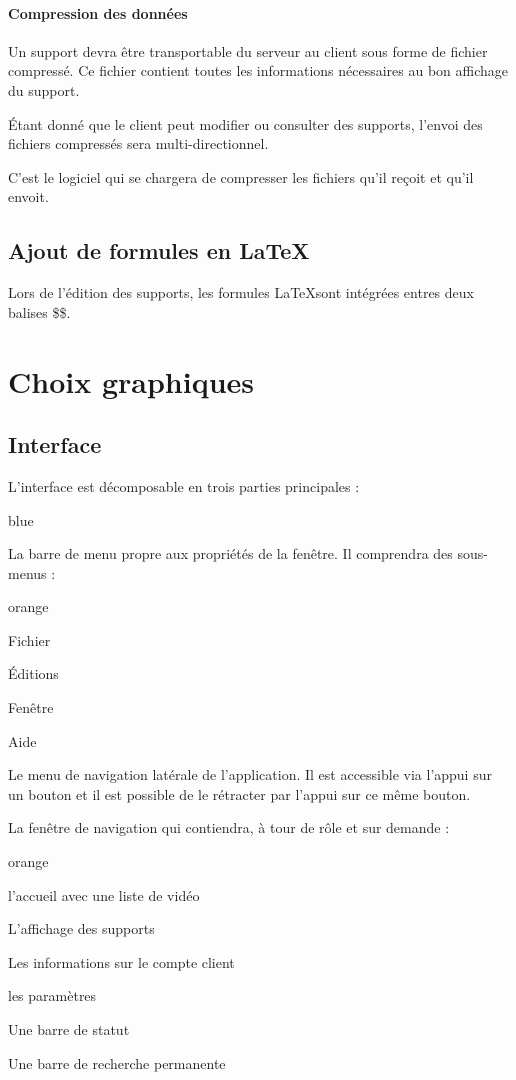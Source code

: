 \subsubsection{Compression des données}

Un support devra être transportable du serveur au client sous forme de fichier compressé. Ce fichier contient toutes les informations nécessaires au bon affichage du support.

Étant donné que le client peut modifier ou consulter des supports, l'envoi des fichiers compressés sera multi-directionnel.

C'est le logiciel qui se chargera de compresser les fichiers qu'il reçoit et qu'il envoit.


\section{Ajout de formules en \LaTeX}

Lors de l'édition des supports, les formules \LaTeX sont intégrées entres deux balises \$\$.


\chapter{Choix graphiques}

\section{Interface}

L'interface est décomposable en trois parties principales :

\begin{items}{blue}{\Triangle}
\item La barre de menu propre aux propriétés de la fenêtre. Il comprendra des sous-menus : 
 \begin{items}{orange}{\Circle}
    \item Fichier
    \item Éditions
    \item Fenêtre
    \item Aide
 \end{items}
 
 \item Le menu de navigation latérale de l'application. Il est accessible via l'appui sur un bouton et il est possible de le rétracter par l'appui sur ce même bouton.
 \item La fenêtre de navigation qui contiendra, à tour de rôle et sur demande : 
  \begin{items}{orange}{\Circle}
    \item l'accueil avec une liste de vidéo
    \item L'affichage des supports
    \item Les informations sur le compte client
    \item les paramètres
 \end{items}
 
 \item Une barre de statut
 \item Une barre de recherche permanente
\end{items}

